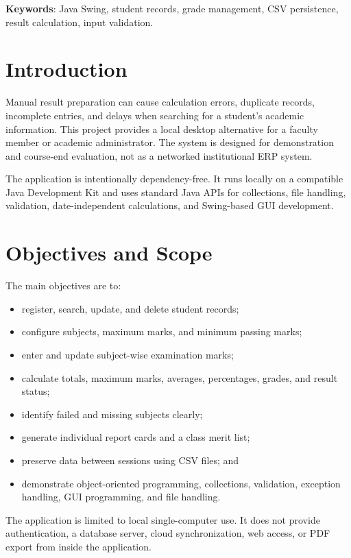 \documentclass[11pt,a4paper]{report}
\begin{document}
\textbf{Keywords}: Java Swing, student records, grade management, CSV persistence, result calculation, input validation.

\section{Introduction}
Manual result preparation can cause calculation errors, duplicate records, incomplete entries, and delays when searching for a student's academic information. This project provides a local desktop alternative for a faculty member or academic administrator. The system is designed for demonstration and course-end evaluation, not as a networked institutional ERP system.

The application is intentionally dependency-free. It runs locally on a compatible Java Development Kit and uses standard Java APIs for collections, file handling, validation, date-independent calculations, and Swing-based GUI development.

\section{Objectives and Scope}
The main objectives are to:
\begin{itemize}
    \item register, search, update, and delete student records;
    \item configure subjects, maximum marks, and minimum passing marks;
    \item enter and update subject-wise examination marks;
    \item calculate totals, maximum marks, averages, percentages, grades, and result status;
    \item identify failed and missing subjects clearly;
    \item generate individual report cards and a class merit list;
    \item preserve data between sessions using CSV files; and
    \item demonstrate object-oriented programming, collections, validation, exception handling, GUI programming, and file handling.
\end{itemize}

The application is limited to local single-computer use. It does not provide authentication, a database server, cloud synchronization, web access, or PDF export from inside the application.
\end{document}

